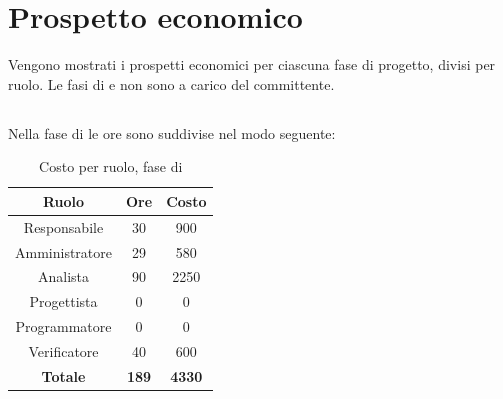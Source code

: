 \section{Prospetto economico}
Vengono mostrati i prospetti economici per ciascuna fase di progetto, divisi per ruolo. Le fasi di \AR{} e \AD{} non sono a carico del committente.

\subsection{\AR}
Nella fase di \AR{} le ore sono suddivise nel modo seguente:
\begin{table}[H]
	\centering
	\begin{tabular}{|c|c|c|}
		\hline
		\textbf{Ruolo} &
		\textbf{Ore} &
		\textbf{Costo} \\
		\hline
		Responsabile & 30 & 900\\
		\hline
		Amministratore & 29 & 580\\
		\hline
		Analista & 90 & 2250\\
		\hline
		Progettista & 0 & 0 \\
		\hline
		Programmatore & 0 & 0 \\
		\hline
		Verificatore & 40 & 600\\
		\hline
		\textbf{Totale} & \textbf{189} & \textbf{4330} \\
		\hline
	\end{tabular}
	\caption{Costo per ruolo, fase di \AR}
\end{table}

